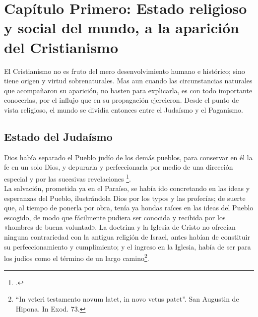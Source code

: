 \raggedbottom{} \documentclass[12pt, a4paper, openany]{book} %
\begin{document}
\chapter{Capítulo Primero: Estado religioso y social del mundo, a la aparición del Cristianismo}
El Cristianismo no es fruto del mero desenvolvimiento humano e histórico; sino tiene origen y virtud sobrenaturales. Mas aun cuando las circunstancias naturales que acompañaron su aparición, no basten para explicarla, es con todo importante conocerlas, por el influjo que en su propagación ejercieron. Desde el punto de vista religioso, el mundo se dividía entonces entre el Judaísmo y el Paganismo.
\section{Estado del Judaísmo}
Dios había separado el Pueblo judío de los demás pueblos, para conservar en él la fe en un solo Dios, y depurarla y perfeccionarla por medio de una dirección especial y por las sucesivas revelaciones \footcites{Flavius1856Opera}{Schurer1910Geschichte}. \\
La salvación, prometida ya en el Paraíso, se había ido concretando en las ideas y esperanzas del Pueblo, ilustrándola Dios por los typos y las profecías; de suerte que, al tiempo de ponerla por obra, tenía ya hondas raíces en las ideas del Pueblo escogido, de modo que fácilmente pudiera ser conocida y recibida por los «hombres de buena voluntad». La doctrina y la Iglesia de Cristo no ofrecían ninguna contrariedad con la antigua religión de Israel, antes habían de constituir su perfeccionamiento y cumplimiento; y el ingreso en la Iglesia, había de ser para los judíos como el término de un largo camino\footnote{``In veteri testamento novum latet, in novo vetus patet''. San Augustin de Hipona. In Exod. 73.}.
\end{document}
